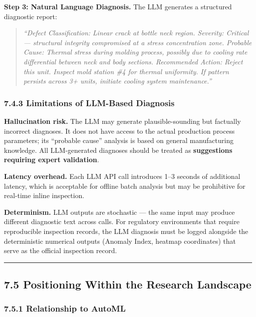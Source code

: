 \textbf{Step 3: Natural Language Diagnosis.} The LLM generates a structured diagnostic report:

\begin{quote}
\emph{``Defect Classification: Linear crack at bottle neck region.\emph{ }Severity: Critical --- structural integrity compromised at a stress concentration zone.\emph{ }Probable Cause: Thermal stress during molding process, possibly due to cooling rate differential between neck and body sections.\emph{ }Recommended Action: Reject this unit. Inspect mold station \#4 for thermal uniformity. If pattern persists across 3+ units, initiate cooling system maintenance.''}
\end{quote}

\subsubsection{7.4.3 Limitations of LLM-Based Diagnosis}\label{limitations-of-llm-based-diagnosis}

\textbf{Hallucination risk.} The LLM may generate plausible-sounding but factually incorrect diagnoses. It does not have access to the actual production process parameters; its ``probable cause'' analysis is based on general manufacturing knowledge. All LLM-generated diagnoses should be treated as \textbf{suggestions requiring expert validation}.

\textbf{Latency overhead.} Each LLM API call introduces 1--3 seconds of additional latency, which is acceptable for offline batch analysis but may be prohibitive for real-time inline inspection.

\textbf{Determinism.} LLM outputs are stochastic --- the same input may produce different diagnostic text across calls. For regulatory environments that require reproducible inspection records, the LLM diagnosis must be logged alongside the deterministic numerical outputs (Anomaly Index, heatmap coordinates) that serve as the official inspection record.

\begin{center}\rule{0.5\linewidth}{0.5pt}\end{center}

\subsection{7.5 Positioning Within the Research Landscape}\label{positioning-within-the-research-landscape}

\subsubsection{7.5.1 Relationship to AutoML}\label{relationship-to-automl}

